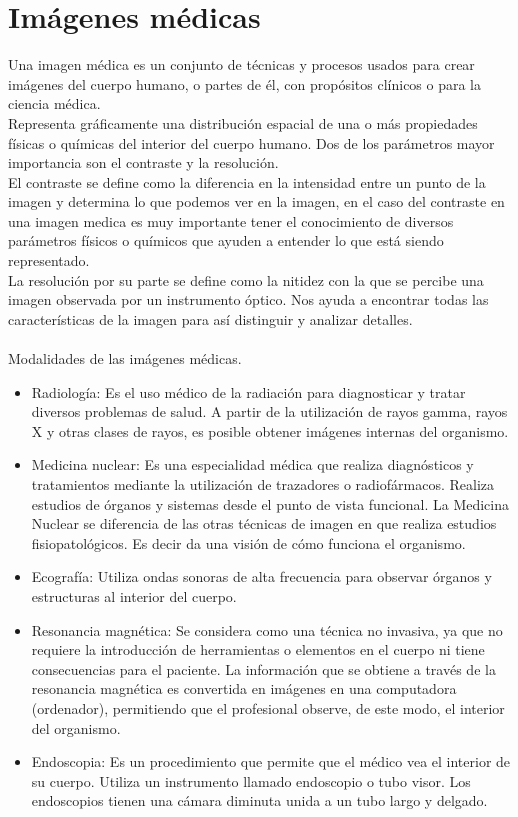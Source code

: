 \documentclass[12pt]{report}
\begin{document}
\section{Imágenes médicas}
Una imagen médica es un conjunto de técnicas y procesos usados para crear imágenes del cuerpo humano, o partes de él, con propósitos clínicos  o para la ciencia médica.\\
Representa gráficamente una distribución espacial de una o más propiedades físicas o químicas del interior del cuerpo humano. Dos de los parámetros mayor importancia son el contraste y la resolución. \\
El contraste se define como la diferencia en la intensidad entre un punto de  la imagen y determina lo que podemos ver en la imagen, en el caso del contraste en una imagen medica es muy importante tener el conocimiento de diversos parámetros físicos o químicos que ayuden a entender lo que está siendo representado.\\
La resolución por su parte se define como la nitidez con la que se percibe una imagen observada por un instrumento óptico. Nos ayuda a encontrar todas las características de la imagen para así distinguir y analizar detalles.\cite{essen} \\ \\
Modalidades de las imágenes médicas.\\
\begin{itemize}
\item Radiología: Es el uso médico de la radiación para diagnosticar y tratar diversos problemas de salud. A partir de la utilización de rayos gamma, rayos X y otras clases de rayos, es posible obtener imágenes internas del organismo.
\item Medicina nuclear: Es una especialidad médica que realiza diagnósticos y tratamientos mediante la utilización de trazadores o radiofármacos. Realiza estudios de órganos y sistemas desde el punto de vista funcional.  La Medicina Nuclear se diferencia de las otras técnicas de imagen en que realiza estudios fisiopatológicos. Es decir da una visión de cómo funciona el organismo.
\item Ecografía: Utiliza ondas sonoras de alta frecuencia para observar órganos y estructuras al interior del cuerpo.
\item Resonancia magnética: Se considera como una técnica no invasiva, ya que no requiere la introducción de herramientas o elementos en el cuerpo ni tiene consecuencias para el paciente. La información que se obtiene a través de la resonancia magnética es convertida en imágenes en una computadora (ordenador), permitiendo que el profesional observe, de este modo, el interior del organismo.
\item Endoscopia: Es un procedimiento que permite que el médico vea el interior de su cuerpo. Utiliza un instrumento llamado endoscopio o tubo visor. Los endoscopios tienen una cámara diminuta unida a un tubo largo y delgado.
\end{itemize}
\end{document}

